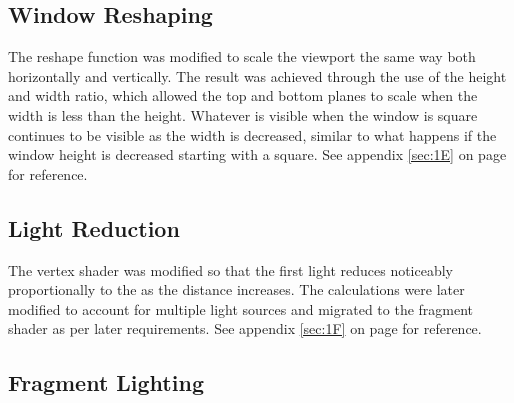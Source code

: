 \documentclass{article}
\begin{document}


\subsection{Window Reshaping}

The reshape function was modified to scale the viewport the same way both horizontally and vertically. The result was achieved through the use of the height and width ratio, which allowed the top and bottom planes to scale when the width is less than the height. Whatever is visible when the window is square continues to be visible as the width is decreased, similar to what happens if the window height is decreased starting with a square. 
\newline
\newline
See appendix \ref{sec:1E} on page \pageref{sec:1E} for reference.




\subsection{Light Reduction}
The vertex shader was modified so that the first light reduces noticeably proportionally to the as the distance increases. The calculations were later modified to account for multiple light sources and migrated to the fragment shader as per later requirements.	
\newline
\newline
See appendix \ref{sec:1F} on page \pageref{sec:1F} for reference.


\subsection{Fragment Lighting}
\end{document}

